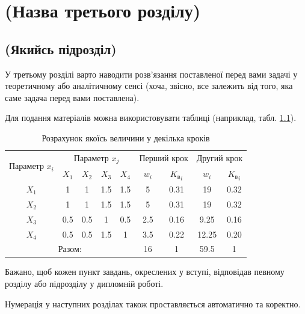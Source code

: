 \chapter{(Назва третього розділу)}
\label{chap:theory}

\section{(Якийсь підрозділ)}

У третьому розділі варто наводити розв'язання поставленої перед вами 
задачі у теоретичному або аналітичному сенсі (хоча, звісно, все залежить 
від того, яка саме задача перед вами поставлена).

Для подання матеріалів можна використовувати таблиці (наприклад, 
табл. \ref{tab_weight}). 

    \begin{table}[ht]
    \caption{Розрахунок якоїсь величини у декілька кроків}
    \label{tab_weight}
    \centering
        \begin{tabular}{|c|c|c|c|c|c|c|c|c|}
        \hline \multirow{2}{*}{Параметр $x_i$} & \multicolumn{4}{c|}{Параметр $x_j$} & 
            \multicolumn{2}{c|}{Перший крок} & \multicolumn{2}{c|}{Другий крок} \\
        \cline{2-9} & $X_1$ & $X_2$ & $X_3$ & $X_4$ & $w_i$ & 
            ${K_\text{в}}_i$ & $w_i$ & ${K_\text{в}}_i$ \\
        \hline $X_1$ & 1 & 1 & 1.5 & 1.5 & 5 & 0.31 & 19 & 0.32 \\
        \hline $X_2$ & 1 & 1 & 1.5 & 1.5 & 5 & 0.31 & 19 & 0.32 \\
        \hline $X_3$ & 0.5 & 0.5 & 1 & 0.5 & 2.5 & 0.16 & 9.25 & 0.16 \\
        \hline $X_4$ & 0.5 & 0.5 & 1.5 & 1 & 3.5 & 0.22 & 12.25 & 0.20 \\
        \hline \multicolumn{5}{|c|}{Разом:} & 16 & 1 & 59.5 & 1 \\
        \hline
        \end{tabular}
    \end{table}

Бажано, щоб кожен пункт завдань, окреслених у вступі, відповідав певному 
розділу або підрозділу у дипломній роботі.

\begin{theorem}
Нумерація у наступних розділах також проставляється автоматично та коректно.
\end{theorem}

